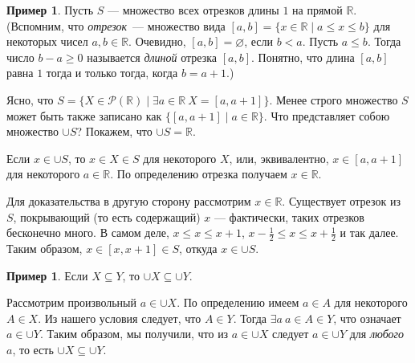 \documentclass[12pt,notitlepage]{article}
\theoremstyle{plain}
\theoremstyle{definition}
\newtheorem{exm}[thm]{Пример}
\theoremstyle{plain}
\newcommand{\R}{\mathbb{R}}
\newcommand{\sbs}{\subseteq}
\newcommand{\void}{\varnothing}
\newcommand{\mP}{\mathcal{P}}
\newcommand{\1}{\mathbf{1}}
\newcommand{\0}{\mathbf{0}}
\begin{document}
\begin{exm}
	Пусть $S$ --- множество всех отрезков длины $1$ на прямой $\R$. (Вспомним, что \emph{отрезок}~--- множество вида $[a,b] = \{ x \in \R \mid a \leq x \leq b \}$ для некоторых чисел $a, b \in \R$. Очевидно, $[a,b] = \void$, если $b < a$. Пусть $a \leq b$. Тогда число $b - a \geq 0$ называется \emph{длиной} отрезка $[a,b]$. Понятно, что длина $[a,b]$ равна $1$ тогда и только тогда, когда $b = a + 1$.)
	
	Ясно, что $S = \{ X \in \mP(\R) \mid \exists a \in \R\ X = [a, a + 1] \}$. Менее строго множество $S$ может быть также записано как $\{ [a,a + 1] \mid a \in \R \}$. Что представляет собою множество $\cup S$? Покажем, что $\cup S = \R$.
	
	Если $x \in \cup S$, то $x \in X \in S$ для некоторого $X$, или, эквивалентно, $x \in [a, a + 1]$ для некоторого $a \in \R$. По определению отрезка получаем $x \in \R$.
	
	Для доказательства в другую сторону рассмотрим $x \in \R$. Существует отрезок из $S$, покрывающий (то есть содержащий) $x$ --- фактически, таких отрезков бесконечно много. В самом деле, $x \leq x \leq x + 1$,  $x - \frac{1}{2} \leq x \leq x + \frac{1}{2}$ и так далее. Таким образом, $x \in [x, x + 1] \in S$, откуда $x \in \cup S$.
\end{exm}

\begin{exm}
	Если $X \sbs Y$, то $\cup X \sbs \cup Y$.
	
	Рассмотрим произвольный $a \in \cup X$. По определению имеем $a \in A$ для некоторого $A \in X$. Из нашего условия следует, что $A \in Y$. Тогда $\exists a\ a \in A \in Y$, что означает $a \in \cup Y$. Таким образом, мы получили, что из $a \in \cup X$ следует $a \in \cup Y$ для \emph{любого} $a$, то есть $\cup X \sbs \cup Y$.
\end{exm}
\end{document}
